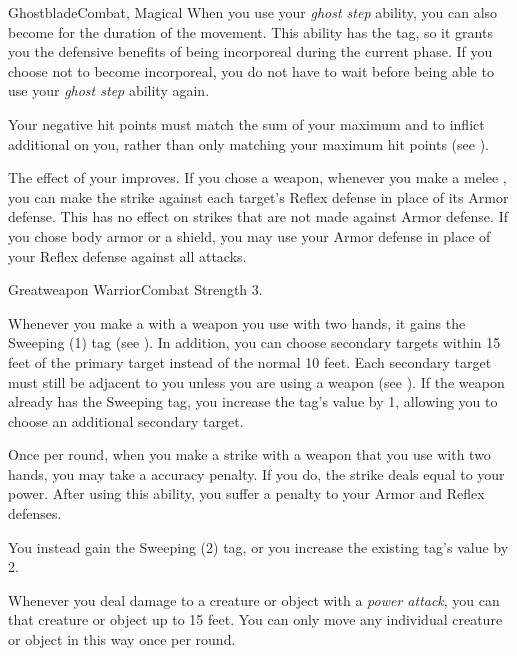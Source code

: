 \begin{magicalfeat}{Ghostblade}{Combat, Magical}
     When you use your \textit{ghost step} ability, you can also become  for the duration of the movement.
    This ability has the  tag, so it grants you the defensive benefits of being incorporeal during the current phase.
    If you choose not to become incorporeal, you do not have to wait  before being able to use your \textit{ghost step} ability again.

     Your negative hit points must match the sum of your maximum  and  to inflict additional  on you, rather than only matching your maximum hit points (see ).

     The effect of your  improves.
    If you chose a weapon, whenever you make a melee , you can make the strike against each target's Reflex defense in place of its Armor defense.
    This has no effect on strikes that are not made against Armor defense.
    If you chose body armor or a shield, you may use your Armor defense in place of your Reflex defense against all attacks.
  \end{magicalfeat}

  \begin{feat}{Greatweapon Warrior}{Combat}
    \featpre Strength 3.

     Whenever you make a   with a weapon you use with two hands, it gains the Sweeping (1) tag (see ).
    In addition, you can choose secondary targets within 15 feet of the primary target instead of the normal 10 feet.
    Each secondary target must still be adjacent to you unless you are using a  weapon (see ).
    If the weapon already has the Sweeping tag, you increase the tag's value by 1, allowing you to choose an additional secondary target.

     Once per round, when you make a  strike with a weapon that you use with two hands, you may take a  accuracy penalty.
    If you do, the strike deals  equal to your power.
    After using this ability, you  suffer a  penalty to your Armor and Reflex defenses.

     You instead gain the Sweeping (2) tag, or you increase the existing tag's value by 2.

     Whenever you deal damage to a creature or object with a \textit{power attack}, you can  that creature or object up to 15 feet.
    You can only move any individual creature or object in this way once per round.
  \end{feat}

